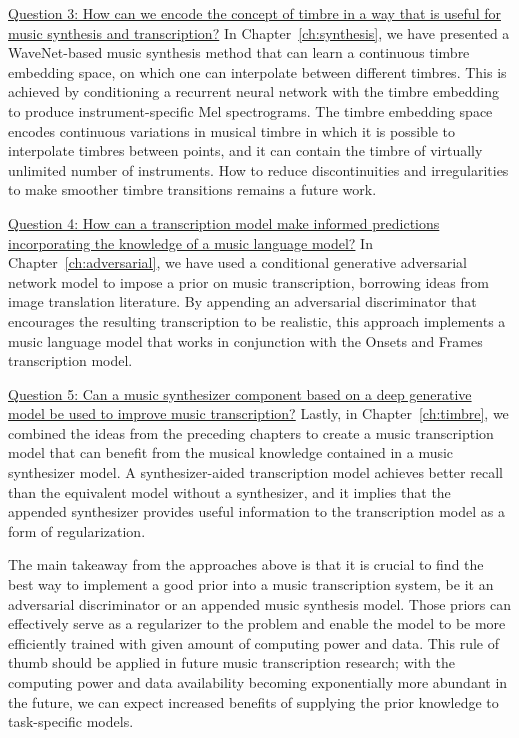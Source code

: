 \uline{Question 3: How can we encode the concept of timbre in a way that is useful for music synthesis and transcription?}
In Chapter~\ref{ch:synthesis}, we have presented a WaveNet-based music synthesis method that can learn a continuous timbre embedding space, on which one can interpolate between different timbres.
This is achieved by conditioning a recurrent neural network with the timbre embedding to produce instrument-specific Mel spectrograms.
The timbre embedding space encodes continuous variations in musical timbre in which it is possible to interpolate timbres between points, and it can contain the timbre of virtually unlimited number of instruments.
How to reduce discontinuities and irregularities to make smoother timbre transitions remains a future work.

\uline{Question 4: How can a transcription model make informed predictions incorporating the knowledge of a music language model?}
In Chapter~\ref{ch:adversarial}, we have used a conditional generative adversarial network model to impose a prior on music transcription, borrowing ideas from image translation literature.
By appending an adversarial discriminator that encourages the resulting transcription to be realistic, this approach implements a music language model that works in conjunction with the Onsets and Frames transcription model.

\uline{Question 5: Can a music synthesizer component based on a deep generative model be used to improve music transcription?}
Lastly, in Chapter~\ref{ch:timbre}, we combined the ideas from the preceding chapters to create a music transcription model that can benefit from the musical knowledge contained in a music synthesizer model.
A synthesizer-aided transcription model achieves better recall than the equivalent model without a synthesizer, and it implies that the appended synthesizer provides useful information to the transcription model as a form of regularization.


The main takeaway from the approaches above is that it is crucial to find the best way to implement a good prior into a music transcription system, be it an adversarial discriminator or an appended music synthesis model.
Those priors can effectively serve as a regularizer to the problem and enable the model to be more efficiently trained with given amount of computing power and data.
This rule of thumb should be applied in future music transcription research; with the computing power and data availability becoming exponentially more abundant in the future, we can expect increased benefits of supplying the prior knowledge to task-specific models.


